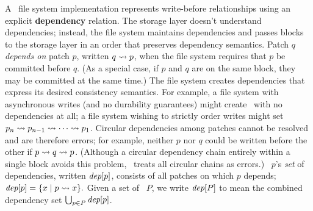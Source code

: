 A \Featherstitch\ file system implementation represents write-before
 relationships using an explicit \textbf{dependency} relation.
%
The storage layer doesn't understand dependencies; instead, the file system
 maintains dependencies and passes blocks to the storage layer in an
 order that preserves dependency semantics.
%
Patch $q$ \emph{depends on} patch $p$, written $q \leadsto p$,
 when the file system requires that $p$ be committed before $q$.
%
(As a special case, if $p$ and $q$ are on the same block, they may be
 committed at the same time.)
%
The file system creates dependencies that express its desired consistency
 semantics.
%
For example, a file system with asynchronous writes (and no durability
 guarantees) might create \patches\ with no dependencies at all;
%
a file system wishing to strictly order writes might set
 $p_n \leadsto p_{n-1} \leadsto \cdots \leadsto p_1$.
%
%
%
Circular dependencies among patches cannot be resolved and are therefore
 errors;  for example, neither $p$ nor $q$ could be written before the
 other if $p \leadsto q \leadsto p$.
%
(Although a circular dependency chain entirely within a single block avoids
 this problem, \Kudos\ treats all circular chains as errors.)
%
\Patch\ $p$'s \emph{set} of dependencies, written $\textit{dep}[p]$, consists
 of all patches on which $p$ depends;
%
\( \textit{dep}[p] = \{ x \mid p \leadsto x \}. \)
%
Given a set of \patches\ $P$, we write $\textit{dep}[P]$ to mean the
 combined dependency set $\bigcup_{p\in P} \textit{dep}[p]$. 


